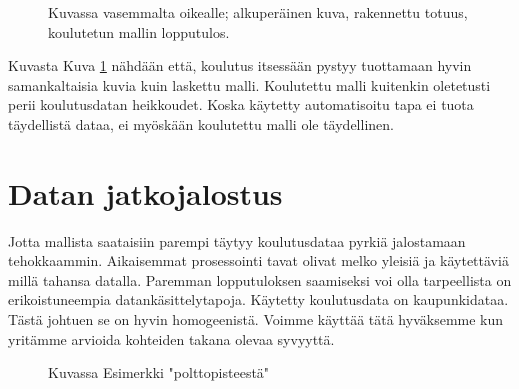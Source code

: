 \begin{figure}[h]
\centering
{}
\caption{Kuvassa vasemmalta oikealle; alkuperäinen kuva, rakennettu totuus, koulutetun mallin lopputulos.}
\label{fig:model}
\end{figure}



Kuvasta Kuva \ref{fig:model}  nähdään että, koulutus itsessään pystyy tuottamaan hyvin samankaltaisia kuvia kuin laskettu malli. Koulutettu malli kuitenkin oletetusti perii koulutusdatan heikkoudet. Koska käytetty automatisoitu tapa ei tuota täydellistä dataa, ei myöskään koulutettu malli ole täydellinen. 


\section{Datan jatkojalostus}

Jotta mallista saataisiin parempi täytyy koulutusdataa pyrkiä jalostamaan tehokkaammin. 
Aikaisemmat prosessointi tavat olivat melko yleisiä ja käytettäviä millä tahansa datalla. Paremman lopputuloksen saamiseksi voi olla tarpeellista on erikoistuneempia datankäsittelytapoja.
Käytetty koulutusdata on kaupunkidataa. Tästä johtuen se on hyvin homogeenistä.
Voimme käyttää tätä hyväksemme kun yritämme arvioida kohteiden takana olevaa syvyyttä.

\begin{figure}[h]
\centering
{}
\caption{Kuvassa Esimerkki "polttopisteestä"}
\label{fig:polttopiste}
\end{figure}


